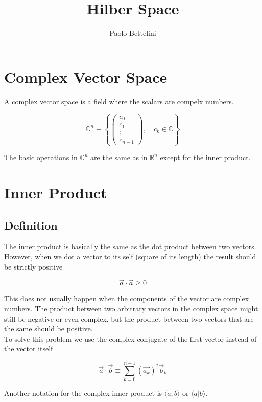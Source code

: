 \documentclass{article}
\title{Hilber Space}
\author{Paolo Bettelini}
\date{}
\newcommand{\braket}[1]{\langle#1\rangle}
\begin{document}
\maketitle
\tableofcontents
\pagebreak

\section{Complex Vector Space}

A complex vector space is a field where the scalars are compelx numbers.

\[
    \mathbb{C}^n \equiv
    \left\{
        \begin{pmatrix}
            c_0 \\
            c_1 \\
            \vdots \\
            c_{n-1}
        \end{pmatrix}
        ,\quad c_k \in \mathbb{C}
    \right\}
\]

The basic operations in \(\mathbb{C}^n\) are the same as in \(\mathbb{R}^n\) except for the inner product. 

\section{Inner Product}

\subsection{Definition}

The inner product is basically the same as the dot product between two vectors.
However, when we dot a vector to its self (square of its length) the result should be strictly positive

\[
    \vec{a} \cdot \vec{a} \geq 0
\]

This does not usually happen when the components of the vector are complex numbers.
The product between two arbitrary vectors in the complex space might still be negative or even complex,
but the product between two vectors that are the same should be positive.\\
To solve this problem we use the complex conjugate of the first vector instead of the vector itself.

\[
    \vec{a} \cdot \vec{b} \equiv \sum_{k=0}^{n-1} {(\vec{a_k})}^{*} \vec{b}_k
\]

Another notation for the complex inner product is \(\braket{a,b}\) or \(\braket{a|b}\).
\end{document}
